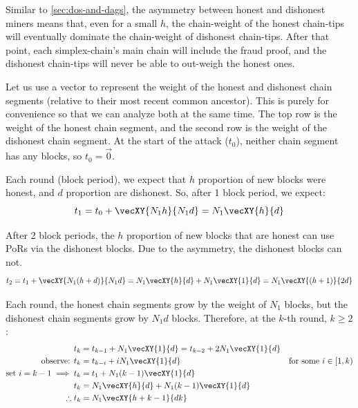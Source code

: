 Similar to \autoref{sec:dos-and-dags}, the asymmetry between honest and dishonest miners means that, even for a small $h$, the chain-weight of the honest chain-tips will eventually dominate the chain-weight of dishonest chain-tips.
After that point, each simplex-chain's main chain will include the fraud proof, and the dishonest chain-tips will never be able to out-weigh the honest ones.

Let us use a vector to represent the weight of the honest and dishonest chain segments (relative to their most recent common ancestor).
This is purely for convenience so that we can analyze both at the same time.
The top row is the weight of the honest chain segment, and the second row is the weight of the dishonest chain segment.
At the start of the attack ($t_0$), neither chain segment has any blocks, so $t_0 = \vec{0}$.

Each round (block period), we expect that $h$ proportion of new blocks were honest, and $d$ proportion are dishonest.
So, after 1 block period, we expect:
\begin{equation*}
    t_1 = t_0 + \vecXY{N_1 h}{N_1 d} = N_1 \vecXY{h}{d}
\end{equation*}

After 2 block periods, the $h$ proportion of new blocks that are honest can use PoRs via the dishonest blocks.
Due to the asymmetry, the dishonest blocks can not.
\begin{equation*}
    t_2 = t_1 + \vecXY{N_1 (h+d)}{N_1 d} = N_1 \vecXY{h}{d} + N_1 \vecXY{1}{d} = N_1 \vecXY{(h + 1)}{2 d}
\end{equation*}

Each round, the honest chain segments grow by the weight of $N_1$ blocks, but the dishonest chain segments grow by $N_1 d$ blocks.
Therefore, at the $k$-th round, $k \ge 2$:
\begin{align}
    t_k &= t_{k-1} + N_1 \vecXY{1}{d} = t_{k-2} + 2 N_1 \vecXY{1}{d} \nonumber \\
    \text{observe: } t_k &= t_{k-i} + i N_1 \vecXY{1}{d} & \text{for some } i \in [1, k) \nonumber \\
    \text{set } i = k - 1 \implies
    t_k &= t_1 + N_1 (k-1) \vecXY{1}{d} \nonumber \\
    t_k &= N_1 \vecXY{h}{d} + N_1 (k-1) \vecXY{1}{d} \nonumber \\
    \therefore t_k &= N_1 \vecXY{h + k - 1}{dk} \label{eq:h-to-d-chain-segs}
\end{align}

